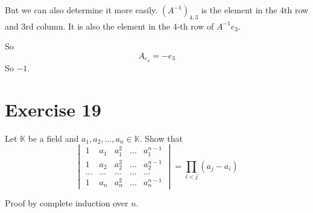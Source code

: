 \documentclass[a4paper]{article}
\theoremstyle{definition}
\begin{document}
But we can also determine it more easily.
$(A^{-1})_{4,3}$ is the element in the 4th row and 3rd column.
It is also the element in the $4$-th row of $A^{-1} e_3$.

So
\[ A_{e_4} = -e_3 \]
So $-1$.

\section{Exercise 19}
\begin{ex}
  Let $\mathbb K$ be a field and $a_1, a_2, \ldots, a_n \in \mathbb K$. Show that
  \[
    \begin{vmatrix}
      1 & a_1 & a_1^2 & \ldots & a_1^{n-1} \\
      1 & a_2 & a_2^2 & \ldots & a_2^{n-1} \\
      \ldots & \ldots & \ldots & \ldots & \ldots \\
      1 & a_n & a_n^2 & \ldots & a_n^{n-1}
    \end{vmatrix}
    = \prod_{i < j}
    (a_j - a_i)
  \]
\end{ex}

Proof by complete induction over $n$.
\end{document}
